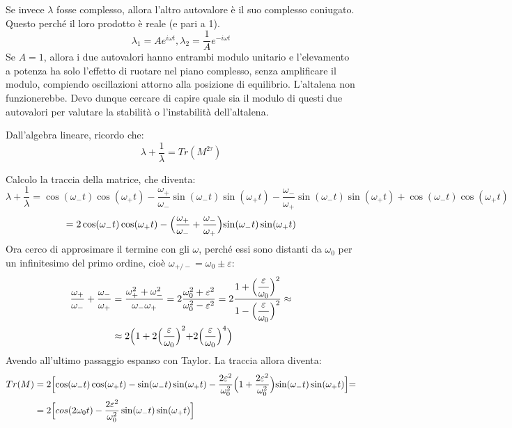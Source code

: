 \documentclass[a4paper,openany]{article}
\begin{document}
	Se invece $\lambda$ fosse complesso, allora l'altro autovalore è il suo complesso coniugato. Questo perché il loro prodotto è reale (e pari a 1).
	$$
	\lambda_1 = Ae^{i\omega t}, \lambda_2 = \dfrac{1}{A}e^{-i\omega t}
	$$ 
	Se $A = 1$, allora i due autovalori hanno entrambi modulo unitario e l'elevamento a potenza ha solo l'effetto di ruotare nel piano complesso, senza amplificare il modulo, compiendo oscillazioni attorno alla posizione di equilibrio. L'altalena non funzionerebbe.  
	Devo dunque cercare di capire quale sia il modulo di questi due autovalori per valutare la stabilità o l'instabilità dell'altalena.
	
	
	Dall'algebra lineare, ricordo che:
	$$
	\lambda + \dfrac{1}{\lambda} = Tr(M^{2\tau})
	$$
	
	Calcolo la traccia della matrice, che diventa:
	\begin{equation}\label{key}
		\lambda + \dfrac{1}{\lambda} = \cos(\omega_- t)\cos(\omega_+ t)-\dfrac{\omega_+}{\omega_-}\sin(\omega_- t)\sin(\omega_+ t) - \dfrac{\omega_-}{\omega_+} \sin(\omega_- t)\sin(\omega_+ t) + \cos(\omega_- t)\cos(\omega_+ t)
	\end{equation}
	\begin{equation}\label{key}
		= 2\cos(\omega_- t)\cos(\omega_+ t) - \Bigl(\dfrac{\omega_+}{\omega_-}+\dfrac{\omega_-}{\omega_+}\Bigl)\sin(\omega_- t)\sin(\omega_+ t)
	\end{equation}
	Ora cerco di approsimare il termine con gli $\omega$, perché essi sono distanti da $\omega_0$ per un infinitesimo del primo ordine, cioè $\omega_{+/-} = \omega_{0} \pm \varepsilon$:
	\begin{equation}\label{key}
		\begin{aligned}
			\dfrac{\omega_+}{\omega_-}+\dfrac{\omega_-}{\omega_+} &= \dfrac{\omega_+^2 + \omega_-^2}{\omega_- \omega_+} = 2 \dfrac{\omega_0^2+\varepsilon^2}{\omega_0^2 - \varepsilon^2} = 2 \dfrac{1+\Bigl(\dfrac{\varepsilon}{\omega_0}\Bigl)^2}{1-\Bigl(\dfrac{\varepsilon}{\omega_0}\Bigl)^2} \approx \\
			&\approx 2\Bigl(1+2\Bigl(\dfrac{\varepsilon}{\omega_0}\Bigl)^2+2\Bigl(\dfrac{\varepsilon}{\omega_0}\Bigl)^4\Bigl)
		\end{aligned}
	\end{equation}
	Avendo all'ultimo passaggio espanso con Taylor. La traccia allora diventa:
	\begin{equation}\label{key}
		\begin{aligned}
			Tr(M) &=2\Bigl[\cos(\omega_- t)\cos(\omega_+ t) - \sin(\omega_- t)\sin(\omega_+ t) - \dfrac{2\varepsilon^2}{\omega_0^2}\Bigl(1+\dfrac{2\varepsilon^2}{\omega_0^2}\Bigl)\sin(\omega_- t)\sin(\omega_+ t) \Bigl] = \\
			&= 2\Bigl[cos(2\omega_0 t) - \dfrac{2\varepsilon^2}{\omega_0^2}\sin(\omega_- t)\sin(\omega_+ t) \Bigl]
		\end{aligned}
	\end{equation}
\end{document}
